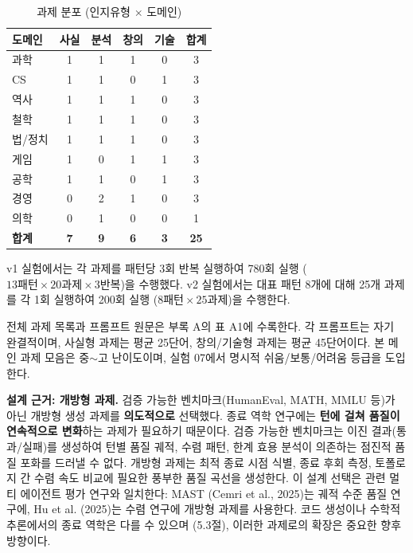 \documentclass[a4paper,11pt]{article}
\begin{document}
\begin{table}[H]
\centering
\caption{과제 분포 (인지유형 $\times$ 도메인)}
\label{tab:task-distribution}
\begin{tabular}{lccccc}
\toprule
\textbf{도메인} & \textbf{사실} & \textbf{분석} & \textbf{창의} & \textbf{기술} & \textbf{합계} \\
\midrule
과학 & 1 & 1 & 1 & 0 & 3 \\
CS & 1 & 1 & 0 & 1 & 3 \\
역사 & 1 & 1 & 1 & 0 & 3 \\
철학 & 1 & 1 & 1 & 0 & 3 \\
법/정치 & 1 & 1 & 1 & 0 & 3 \\
게임 & 1 & 0 & 1 & 1 & 3 \\
공학 & 1 & 1 & 0 & 1 & 3 \\
경영 & 0 & 2 & 1 & 0 & 3 \\
의학 & 0 & 1 & 0 & 0 & 1 \\
\midrule
\textbf{합계} & \textbf{7} & \textbf{9} & \textbf{6} & \textbf{3} & \textbf{25} \\
\bottomrule
\end{tabular}
\end{table}

v1 실험에서는 각 과제를 패턴당 3회 반복 실행하여 780회 실행 ($13\text{패턴} \times 20\text{과제} \times 3\text{반복}$)을 수행했다. v2 실험에서는 대표 패턴 8개에 대해 25개 과제를 각 1회 실행하여 200회 실행 ($8\text{패턴} \times 25\text{과제}$)을 수행한다.

전체 과제 목록과 프롬프트 원문은 부록 A의 표 A1에 수록한다. 각 프롬프트는 자기 완결적이며, 사실형 과제는 평균 25단어, 창의/기술형 과제는 평균 45단어이다. 본 메인 과제 모음은 중$\sim$고 난이도이며, 실험 07에서 명시적 쉬움/보통/어려움 등급을 도입한다.

\textbf{설계 근거: 개방형 과제.} 검증 가능한 벤치마크(HumanEval, MATH, MMLU 등)가 아닌 개방형 생성 과제를 \textbf{의도적으로} 선택했다. 종료 역학 연구에는 \textbf{턴에 걸쳐 품질이 연속적으로 변화}하는 과제가 필요하기 때문이다. 검증 가능한 벤치마크는 이진 결과(통과/실패)를 생성하여 턴별 품질 궤적, 수렴 패턴, 한계 효용 분석이 의존하는 점진적 품질 포화를 드러낼 수 없다. 개방형 과제는 최적 종료 시점 식별, 종료 후회 측정, 토폴로지 간 수렴 속도 비교에 필요한 풍부한 품질 곡선을 생성한다. 이 설계 선택은 관련 멀티 에이전트 평가 연구와 일치한다: MAST (Cemri et al., 2025)는 궤적 수준 품질 연구에, Hu et al. (2025)는 수렴 연구에 개방형 과제를 사용한다. 코드 생성이나 수학적 추론에서의 종료 역학은 다를 수 있으며 (5.3절), 이러한 과제로의 확장은 중요한 향후 방향이다.
\end{document}
